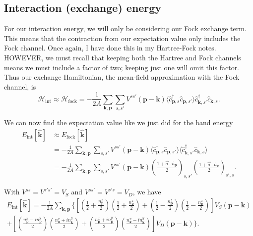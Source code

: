 \documentclass[12pt]{revtex4-2}
\begin{document}
\subsection{Interaction (exchange) energy}
For our interaction energy, we will only be considering our Fock exchange term.  This means that the contraction from our expectation value only includes the Fock channel.  Once again, I have done this in my Hartree-Fock notes.  HOWEVER, we must recall that keeping both the Hartree and Fock channels means we must include a factor of two; keeping just one will omit this factor.  Thus our exchange Hamiltonian, the mean-field approximation with the Fock channel, is
\begin{equation}
    \mathcal{H}_\text{int} \approx \mathcal{H}_\text{fock} = -\frac{1}{2A} \sum_{\mathbf{k},\mathbf{p}} \sum_{s,s'} V^{ss'}(\mathbf{p}-\mathbf{k}) \langle \hat{c}_{\mathbf{p},s}^\dagger \hat{c}_{\mathbf{p},s'} \rangle\hat{c}_{\mathbf{k},s'}^\dagger \hat{c}_{\mathbf{k},s}.
\end{equation}

We can now find the expectation value like we just did for the band energy
\begin{align}
    E_\text{int}[\hat{\mathbf{k}}] &\approx E_\text{fock}[\hat{\mathbf{k}}] \\
    &= -\frac{1}{2A} \sum_{\mathbf{k},\mathbf{p}} \sum_{s,s'} V^{ss'}(\mathbf{p}-\mathbf{k}) \langle \hat{c}_{\mathbf{p},s}^\dagger \hat{c}_{\mathbf{p},s'} \rangle \langle \hat{c}_{\mathbf{k},s'}^\dagger \hat{c}_{\mathbf{k},s} \rangle \\
    &= -\frac{1}{2A} \sum_{\mathbf{k},\mathbf{p}} \sum_{s,s'} V^{ss'}(\mathbf{p}-\mathbf{k}) \left( \frac{1 + \vec{\sigma} \cdot \hat{n}_\mathbf{p}}{2} \right)_{s,s'} \left( \frac{1 + \vec{\sigma} \cdot \hat{n}_\mathbf{k}}{2} \right)_{s',s}.
\end{align}

With $V^{ss} = V^{s's'} = V_S$ and $V^{ss'} = V^{s's} = V_D$, we have 
\begin{multline}
    E_\text{int}[\hat{\mathbf{k}}] = -\frac{1}{2A} \sum_{\mathbf{k},\mathbf{p}} \bigg\{\left[ \left( \frac{1}{2} + \frac{n_\mathbf{p}^z}{2} \right)\left( \frac{1}{2} + \frac{n_\mathbf{k}^z}{2} \right) + \left( \frac{1}{2} - \frac{n_\mathbf{p}^z}{2} \right)\left( \frac{1}{2} - \frac{n_\mathbf{k}^z}{2} \right) \right] V_S(\mathbf{p}-\mathbf{k}) \\
    + \left[ \left( \frac{n_\mathbf{p}^x - in_\mathbf{p}^y}{2} \right)\left( \frac{n_\mathbf{k}^x + in_\mathbf{k}^y}{2} \right) + \left( \frac{n_\mathbf{p}^x + in_\mathbf{p}^y}{2} \right)\left( \frac{n_\mathbf{k}^x - in_\mathbf{k}^y}{2} \right) \right]V_D(\mathbf{p}-\mathbf{k})\bigg\}.
\end{multline}
\end{document}
